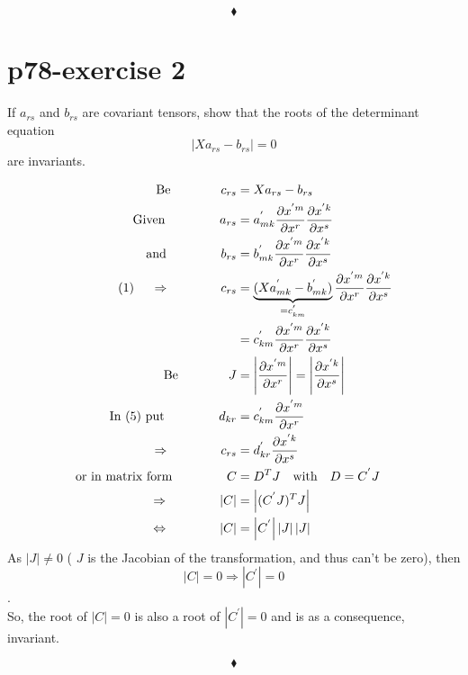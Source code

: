 $$\blacklozenge$$
\newpage

\section{p78-exercise 2}
\begin{tcolorbox}
If $a_{rs}$ and $b_{rs}$ are covariant tensors, show that the roots of the determinant equation $$\left|Xa_{rs} - b_{rs}\right |= 0$$ are invariants.
\end{tcolorbox}
\begin{align}
\text{Be}\quad\quad\quad\quad c_{rs} &= Xa_{rs} - b_{rs}\\
\text{Given }\quad\quad\quad\quad a_{rs} &= a^{'}_{mk}\pdv{x^{'m}}{x^r} \pdv{x^{'k}}{x^s}\\
\text{and }\quad\quad\quad\quad b_{rs} &= b^{'}_{mk}\pdv{x^{'m}}{x^r} \pdv{x^{'k}}{x^s}\\
\text{(1) }\quad\Rightarrow\quad\quad\quad\quad c_{rs} &= \underbrace{(Xa^{'}_{mk}-b^{'}_{mk})}_{=c^{'}_{km}} \pdv{x^{'m}}{x^r} \pdv{x^{'k}}{x^s}\\
\ &= c^{'}_{km} \pdv{x^{'m}}{x^r} \pdv{x^{'k}}{x^s}\\
\text{Be}\quad\quad\quad\quad J &= \left |\pdv{x^{'m}}{x^r}\right |= \left |\pdv{x^{'k}}{x^s}\right |\\
\text{In (5) put  }\quad\quad\quad\quad d_{kr} &= c^{'}_{km} \pdv{x^{'m}}{x^r} \\
\Rightarrow\quad\quad\quad\quad c_{rs} &= d^{'}_{kr} \pdv{x^{'k}}{x^s}\\
\text{or in matrix form  } \quad\quad\quad\quad C &= D^T J\quad \text{with}\quad D = C^{'}J\\
\Rightarrow\quad\quad\quad\quad \left |C \right| &= \left | (C^{'}J)^T J\right |\\
\Leftrightarrow\quad\quad\quad\quad \left |C \right| &= \left | C^{'}\right | \left |J\right |\left |J\right |
\end{align}
As $ \left |J\right | \ne 0$ ( $J$ is the Jacobian of the transformation, and thus can't be zero), then $$\left |C \right| = 0 \Rightarrow \left |C^{'} \right| = 0$$.\\
So, the root of $\left |C \right| = 0 $ is also a root of $\left |C^{'} \right| = 0$ and is as a consequence, invariant.

$$\blacklozenge$$
\newpage

